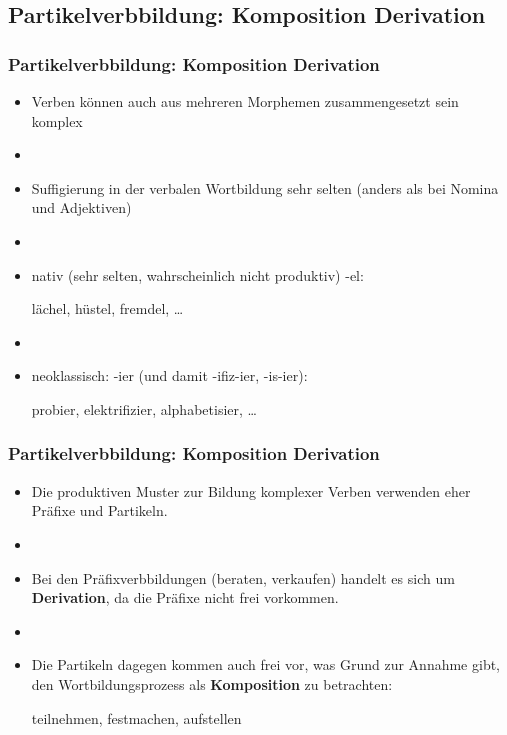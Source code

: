 \subsection{Partikelverbbildung: Komposition \vs Derivation}



\begin{frame}
\frametitle{Partikelverbbildung: Komposition \vs Derivation}

\begin{itemize}
	\item Verben können auch aus mehreren Morphemen zusammengesetzt sein \ras komplex 
	\item[]
	\item Suffigierung in der verbalen Wortbildung \ras sehr selten (anders als bei Nomina und Adjektiven)
	\item[]
	\item nativ (sehr selten, wahrscheinlich nicht produktiv) -el:
	
	\ea lächel, hüstel, fremdel, \dots
	\z

	\item[]
	\item neoklassisch: -ier (und damit -ifiz-ier, -is-ier):
	
	\ea probier, elektrifizier, alphabetisier, \dots 
	\z
	
\end{itemize}

\end{frame}




\begin{frame}
\frametitle{Partikelverbbildung: Komposition \vs Derivation}

\begin{itemize}
	\item Die produktiven Muster zur Bildung komplexer Verben verwenden eher Präfixe und Partikeln.
	\item[]
	\item Bei den Präfixverbbildungen (beraten, verkaufen) handelt es sich um \textbf{Derivation}, da die Präfixe nicht frei vorkommen.
	\item[]
	\item Die Partikeln dagegen kommen auch frei vor, was Grund zur Annahme gibt, den Wortbildungsprozess als \textbf{Komposition} zu betrachten:
	
	\ea teilnehmen, festmachen, aufstellen
	\z
	
\end{itemize}

\end{frame}



